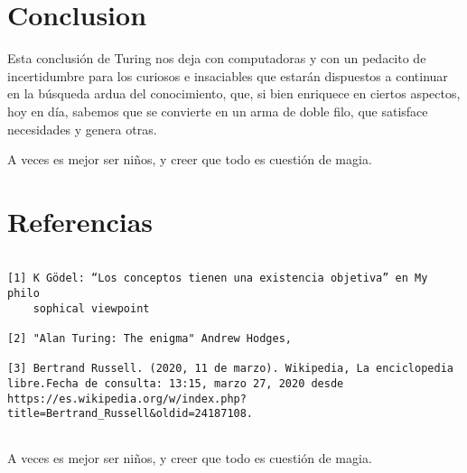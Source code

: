 \documentclass{article}
\begin{document}
\section*{Conclusion}
Esta conclusión de Turing nos deja con computadoras y con un pedacito de incertidumbre para los curiosos e insaciables que estarán dispuestos a continuar en la búsqueda ardua del conocimiento, que, si bien enriquece en ciertos aspectos, hoy en día, sabemos que se convierte en un arma de doble filo, que satisface necesidades y genera otras.

A veces es mejor ser niños, y creer que todo es cuestión de magia.

\section*{Referencias}
\small 

\begin{verbatim}
 
[1] K Gödel: “Los conceptos tienen una existencia objetiva” en My philo
    sophical viewpoint
    
[2] "Alan Turing: The enigma" Andrew Hodges,
    
[3] Bertrand Russell. (2020, 11 de marzo). Wikipedia, La enciclopedia libre.Fecha de consulta: 13:15, marzo 27, 2020 desde https://es.wikipedia.org/w/index.php?title=Bertrand_Russell&oldid=24187108.
    

\end{verbatim}



A veces es mejor ser niños, y creer que todo es cuestión de magia.
\end{document}
